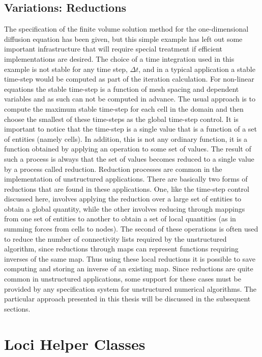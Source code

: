 \documentclass[10pt,epsf]{book}
\begin{document}
\subsection{Variations: Reductions}

The specification of the finite volume solution method for the
one-dimensional diffusion equation has been given, but this simple
example has left out some important infrastructure that will require
special treatment if efficient implementations are desired.  The
choice of a time integration used in this example is not stable for
any time step, $\Delta t$, and in a typical application a stable
time-step would be computed as part of the iteration calculation.  For
non-linear equations the stable time-step is a function of mesh
spacing and dependent variables and as such can not be computed in
advance.  The usual approach is to compute the maximum stable
time-step for each cell in the domain and then choose the smallest of
these time-steps as the global time-step control.  It is important to
notice that the time-step is a single value that is a function of a
set of entities (namely cells).  In addition, this is not any ordinary
function, it is a function obtained by applying an operation to some
set of values.  The result of such a process is always that the set of
values becomes reduced to a single value by a process called
reduction.  Reduction processes are common in the implementation of
unstructured applications.  There are basically two forms of
reductions that are found in these applications.  One, like the
time-step control discussed here, involves applying the reduction over
a large set of entities to obtain a global quantity, while the other
involves reducing through mappings from one set of entities to another
to obtain a set of local quantities (as in summing forces from cells
to nodes).  The second of these operations is often used to reduce the
number of connectivity lists required by the unstructured algorithm,
since reductions through maps can represent functions requiring
inverses of the same map.  Thus using these local reductions it is
possible to save computing and storing an inverse of an existing map.
Since reductions are quite common in unstructured applications, some
support for these cases must be provided by any specification system
for unstructured numerical algorithms.  The particular approach
presented in this thesis will be discussed in the subsequent sections.



\section{Loci Helper Classes}
\end{document}
